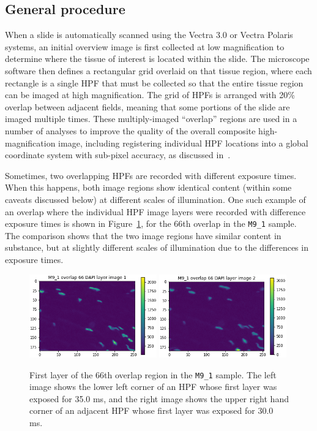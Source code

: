 \documentclass[letterpaper,11pt]{article}
\newcommand{\reffig}[1]{Figure~\ref{#1}}
\begin{document}
\subsection{General procedure}
\label{ssec:general_procedure}

When a slide is automatically scanned using the Vectra 3.0 or Vectra Polaris systems, an initial overview image is first collected at low magnification to determine where the tissue of interest is located within the slide. The microscope software then defines a rectangular grid overlaid on that tissue region, where each rectangle is a single HPF that must be collected so that the entire tissue region can be imaged at high magnification. The grid of HPFs is arranged with 20\% overlap between adjacent fields, meaning that some portions of the slide are imaged multiple times. These multiply-imaged ``overlap'' regions are used in a number of analyses to improve the quality of the overall composite high-magnification image, including registering individual HPF locations into a global coordinate system with sub-pixel accuracy, as discussed in~\cite{Heshy}.

Sometimes, two overlapping HPFs are recorded with different exposure times. When this happens, both image regions show identical content (within some caveats discussed below) at different scales of illumination. One such example of an overlap where the individual HPF image layers were recorded with difference exposure times is shown in \reffig{fig:raw_M9_1_overlap_66}, for the 66th overlap in the \texttt{M9\_1} sample. The comparison shows that the two image regions have similar content in substance, but at slightly different scales of illumination due to the differences in exposure times. 

\begin{figure}[!ht]
\centering
\includegraphics[width=0.49\textwidth]{images/methods/raw_M9_1_overlap_66_dapi_image_1}
\includegraphics[width=0.49\textwidth]{images/methods/raw_M9_1_overlap_66_dapi_image_2}
\caption{\footnotesize First layer of the 66th overlap region in the \texttt{M9\_1} sample. The left image shows the lower left corner of an HPF whose first layer was exposed for 35.0 ms, and the right image shows the upper right hand corner of an adjacent HPF whose first layer was exposed for 30.0 ms.}
\label{fig:raw_M9_1_overlap_66}
\end{figure}
\end{document}
